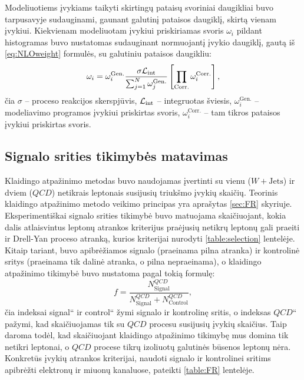 \documentclass[a4paper, 12pt, oneside]{article}
\newcommand{\WJets}{W\! +\!\mathrm{Jets}}
\newcommand{\ltq}[1]{{\quotedblbase{}#1\textquotedblleft{}}}
\newcommand{\Lumi}{{\cal L}_\mathrm{int}}
\newcommand{\QCD}{QC\! D}
\newlength\q
\begin{document}
Modeliuotiems įvykiams taikyti skirtingų pataisų svoriniai daugikliai buvo tarpusavyje sudauginami, gaunant galutinį pataisos
daugiklį, skirtą vienam įvykiui.
Kiekvienam modeliuotam įvykiui priskiriamas svoris $\omega_i$ pildant histogramas buvo nustatomas sudauginant normuojantį įvykio daugiklį,
gautą iš \eqref{eq:NLOweight} formulės, su galutiniu pataisos daugikliu:
\begin{equation}
\label{eq:weightCorr}
	\omega_i = \omega_{i}^{\mathrm{Gen.}} \frac{ \sigma\Lumi }{ \sum_{j=1}^{N}\omega_{j}^{\mathrm{Gen.}} }
			   \left[ \prod_{\mathrm{Corr.}} \omega_i^{\mathrm{Corr.}} \right] ,
\end{equation}
čia $\sigma$ -- proceso reakcijos skerspjūvis, $\Lumi$ -- integruotas šviesis, $\omega_{i}^{\mathrm{Gen.}}$ -- modeliavimo
programos įvykiui priskirtas svoris, $\omega_i^{\mathrm{Corr.}}$ -- tam tikros pataisos įvykiui priskirtas svoris.

\subsection{Signalo srities tikimybės matavimas}\label{sec:FRmeasure}
Klaidingo atpažinimo metodas buvo naudojamas įvertinti su vienu ($\WJets$) ir dviem ($\QCD$) netikrais leptonais
susijusių triukšmo įvykių skaičių.
Teorinis klaidingo atpažinimo metodo veikimo principas yra aprašytas \ref{sec:FR} skyriuje.
Eksperimentiškai signalo srities tikimybė buvo matuojama skaičiuojant, kokia dalis atlaisvintus leptonų atrankos
kriterijus praėjusių netikrų leptonų gali praeiti ir Drell-Yan proceso atranką, kurios kriterijai nurodyti
\ref{table:selection} lentelėje.
Kitaip tariant, buvo apibrėžiamos signalo (praeinama pilna atranka) ir kontrolinė sritys (praeinama tik dalinė
atranka, o pilna nepraeinama), o klaidingo atpažinimo tikimybė buvo nustatoma pagal tokią formulę:
\begin{equation}
	\label{eq:FRexp}
	f = \frac{N_{\mathrm{Signal}}^{\QCD}}{N_{\mathrm{Signal}}^{\QCD}+N_{\mathrm{Control}}^{\QCD}},
\end{equation}
čia indeksai \ltq{signal} ir \ltq{control} žymi signalo ir kontrolinę sritis, o indeksas \ltq{$\QCD$} pažymi, kad
skaičiuojamas tik su $\QCD$ procesu susijusių įvykių skaičius.
Taip daroma todėl, kad skaičiuojant klaidingo atpažinimo tikimybę mus domina tik netikri leptonai,
o $\QCD$ procese tikrų izoliuotų galutinės būsenos leptonų nėra.
Konkretūs įvykių atrankos kriterijai, naudoti signalo ir kontrolinei sritims apibrėžti elektronų ir miuonų kanaluose,
pateikti \ref{table:FR} lentelėje.
\end{document}
